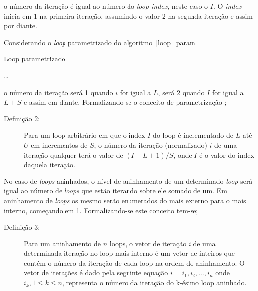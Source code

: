 o número da iteração é igual ao número do \textit{loop index}, neste caso o $I$.
O \textit{index} inicia em 1 na primeira iteração, assumindo o valor 2 na
segunda iteração e assim por diante.

Considerando o \textit{loop} parametrizado do algoritmo~\ref{loop_param}

\begin{algorithm}
        \caption{Loop parametrizado}
        \label{loop_param}
        \begin{algorithmic}[1]
                \STATE \ldots
                \ENDFOR
        \end{algorithmic}
\end{algorithm}

o número da iteração será 1 quando $i$ for igual a $L$, será 2 quando $I$ for
igual a $L+S$ e assim em diante. 
Formalizando-se o conceito de parametrização \cite[2.2]{ocfma};

\begin{description}
        \item [Definição 2:] Para um loop arbitrário em que o index $I$ do loop é
        incrementado de $L$ até $U$ em incrementos de $S$, o número da iteração
        (normalizado) $i$ de uma iteração qualquer terá o valor de 
        $(I - L + 1)/ S$, onde $I$ é o valor do index daquela iteração.
\end{description}

No caso de \textit{loops} aninhados, o nível de aninhamento de um determinado 
\textit{loop} será igual ao número de \textit{loops} que estão iterando sobre
ele somado de um. Em aninhamento de \textit{loops} os mesmo serão enumerados do
mais externo para o mais interno, começando em 1. Formalizando-se este conceito
tem-se;

\begin{description}
        \item[Definição 3:] Para um aninhamento de $n$ loops, o vetor de
                iteração $i$ de uma determinada iteração no loop mais interno 
                é um vetor de inteiros que contém o número da iteração de cada 
                loop na ordem do aninhamento. 
                O vetor de iterações é dado pela seguinte equação
                $i = {i_1, i_2, \ldots, i_n}$
                onde $i_k, 1 \leq k \leq n$, representa o número da iteração do 
                k-ésimo loop aninhado.
\end{description}

